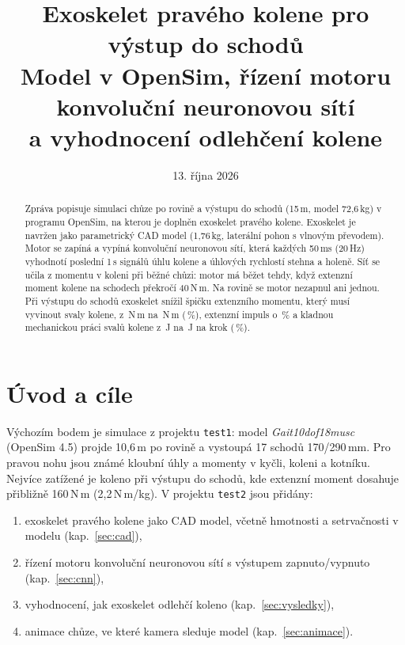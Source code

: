 \documentclass[11pt,a4paper]{article}
\title{\textbf{Exoskelet pravého kolene pro výstup do schodů}\\[4pt]
\large Model v OpenSim, řízení motoru konvoluční neuronovou sítí\\a vyhodnocení odlehčení kolene}
\author{}
\date{13. října 2026}
\newcommand{\Nm}{\,N\,m}
\newcommand{\pct}{\,\%}
\begin{document}
\maketitle
\thispagestyle{empty}

\begin{abstract}
\noindent
Zpráva popisuje simulaci chůze po rovině a výstupu do schodů (15\,m, model 72,6\,kg)
v programu OpenSim, na kterou je doplněn exoskelet pravého kolene. Exoskelet je navržen jako
parametrický CAD model (1,76\,kg, laterální pohon s vlnovým převodem). Motor se zapíná a vypíná
konvoluční neuronovou sítí, která každých 50\,ms (20\,Hz) vyhodnotí poslední 1\,s signálů
úhlu kolene a úhlových rychlostí stehna a holeně. Síť se učila z momentu v koleni při běžné chůzi:
motor má běžet tehdy, když extenzní moment kolene na schodech překročí 40\Nm.
Na rovině se motor nezapnul ani jednou. Při výstupu do schodů exoskelet snížil
špičku extenzního momentu, který musí vyvinout svaly kolene, z \SchodyBezSpicka\Nm{} na
\SchodyCnnSpicka\Nm{} (\SchodyCnnSpickaPct\pct), extenzní impuls o \SchodyCnnImpulsRed\pct{}
a kladnou mechanickou práci svalů kolene z \SchodyBezPrace\,J na \SchodyCnnPrace\,J na krok
(\SchodyCnnPracePct\pct).
\end{abstract}

\tableofcontents
\newpage

\section{Úvod a cíle}

Výchozím bodem je simulace z projektu \texttt{test1}: model
\emph{Gait10dof18musc} (OpenSim 4.5) projde 10,6\,m po rovině a vystoupá 17 schodů
170/290\,mm. Pro pravou nohu jsou známé kloubní úhly a momenty v kyčli, koleni a kotníku.
Nejvíce zatížené je koleno při výstupu do schodů, kde extenzní moment dosahuje přibližně
160\Nm{} (2,2\Nm/kg). V projektu \texttt{test2} jsou přidány:

\begin{enumerate}
  \item exoskelet pravého kolene jako CAD model, včetně hmotnosti a setrvačnosti v modelu (kap.~\ref{sec:cad}),
  \item řízení motoru konvoluční neuronovou sítí s výstupem zapnuto/vypnuto (kap.~\ref{sec:cnn}),
  \item vyhodnocení, jak exoskelet odlehčí koleno (kap.~\ref{sec:vysledky}),
  \item animace chůze, ve které kamera sleduje model (kap.~\ref{sec:animace}).
\end{enumerate}
\end{document}

